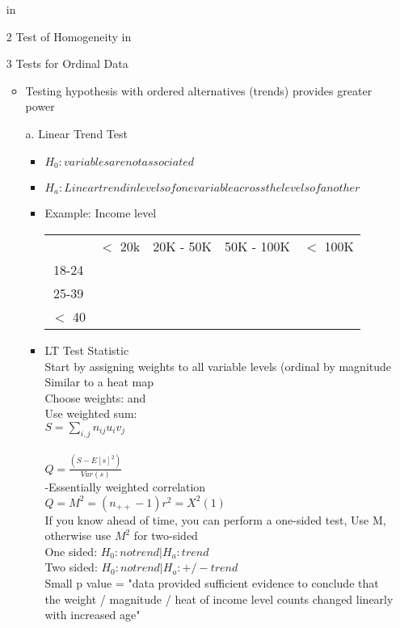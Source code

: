 \documentclass[12 pt]{article}
\begin{document}
\begin{itemize}
\begin{itemize}
    \end{itemize}
     in
    \item [2] Test of Homogeneity
     in
    \item [3] Tests for Ordinal Data
        \begin{itemize}
        \item Testing hypothesis with ordered alternatives (trends) provides greater power
        \item [a.] Linear Trend Test
            \begin{itemize}
                \item \( H_0: variables are not associated \)
                \item \( H_a: Linear trend in levels of one variable across the levels of another \)
                \item Example: Income level\\
                \begin{tabular}{c|c|c|c|c}
                        & $<$ 20k & 20K - 50K & 50K - 100K & $<$ 100K\\
                    18-24 & & & &\\
                    25-39 &  & & &\\
                     $<$ 40 & & & &\\
                \end{tabular}
                \item LT Test Statistic\\
                Start by assigning weights to all variable levels (ordinal by magnitude\\
                Similar to a heat map \\
                Choose weights:  and \\
                Use weighted sum:\\
                $ S = \sum_{i,j} n_{ij} u_i v_j $\\\\
                $ Q=\frac{(S-E[s]^2)}{Var(s)} $ \\
                -Essentially weighted correlation\\
                \(Q = M^2 = (n_{++}-1)r^2 = X^2(1)\)\\
                If you know ahead of time, you can perform a one-sided test, Use M, otherwise use \(M^2\) for two-sided\\
                One sided: \(H_0: no trend | H_a: trend\)\\
                Two sided: \(H_0: no trend | H_a: + / - trend\)\\  
                Small p value = "data provided sufficient evidence to conclude that the weight / magnitude / heat of income level counts changed linearly with increased age"
            \end{itemize}
        

\end{itemize}
\end{itemize}
\end{document}
